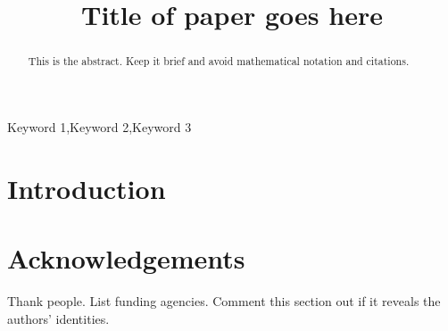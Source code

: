 \documentclass[11pt,3p,review,authoryear]{elsarticle}
\begin{document}
\begin{frontmatter}

\title{Title of paper goes here}





\begin{abstract}
This is the abstract. Keep it brief and avoid mathematical notation and citations.
\end{abstract}

\begin{keyword}
Keyword 1\sep Keyword 2\sep Keyword 3
\end{keyword}

\end{frontmatter}


\section{Introduction}


\section*{Acknowledgements}

Thank people.
List funding agencies.
Comment this section out if it reveals the authors' identities.



\end{document}
